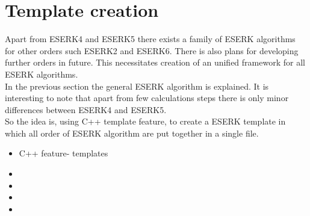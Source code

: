 \section{Template creation}

Apart from ESERK4 and ESERK5 there exists a family of ESERK algorithms for other orders such ESERK2 and ESERK6. There is also plans for developing further orders in future. This necessitates creation of an unified framework for all ESERK algorithms. \\

In the previous section the general ESERK algorithm is explained. It is interesting to note that apart from few calculations steps there is only minor differences between ESERK4 and ESERK5. \\

So the idea is, using C++ template feature, to create a ESERK template in which all order of ESERK algorithm are put together in a single file.\\

    
\begin{itemize}
	\item C++ feature- templates  
	\item 
	\item 
	\item 
	\item
\end{itemize}